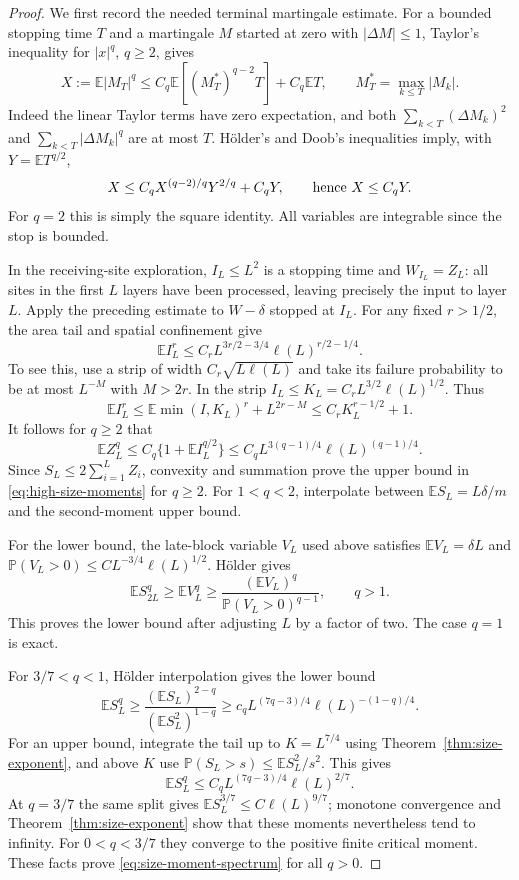 \documentclass[11pt]{article}
\numberwithin{equation}{section}
\theoremstyle{definition}
\newcommand{\E}{\mathbb E}
\newcommand{\Prob}{\mathbb P}
\begin{document}
\begin{proof}
We first record the needed terminal martingale estimate. For a bounded stopping time $T$ and a martingale $M$ started at zero with $|\Delta M|\le1$, Taylor's inequality for $|x|^q$, $q\ge2$, gives
\[
 X:=\E|M_T|^q
 \le C_q\E[(M_T^*)^{q-2}T]+C_q\E T,
 \qquad M_T^*=\max_{k\le T}|M_k|.
\]
Indeed the linear Taylor terms have zero expectation, and both $\sum_{k<T}(\Delta M_k)^2$ and $\sum_{k<T}|\Delta M_k|^q$ are at most $T$. H\"older's and Doob's inequalities imply, with $Y=\E T^{q/2}$,
\[
 X\le C_qX^{(q-2)/q}Y^{2/q}+C_qY,
 \qquad\hbox{hence }X\le C_qY.
\]
For $q=2$ this is simply the square identity. All variables are integrable since the stop is bounded.

In the receiving-site exploration, $I_L\le L^2$ is a stopping time and $W_{I_L}=Z_L$: all sites in the first $L$ layers have been processed, leaving precisely the input to layer $L$. Apply the preceding estimate to $W-\delta$ stopped at $I_L$. For any fixed $r>1/2$, the area tail and spatial confinement give
\begin{equation}\label{eq:truncated-area-higher-moments}
 \E I_L^r\le C_r L^{3r/2-3/4}\ell(L)^{r/2-1/4}.
\end{equation}
To see this, use a strip of width $C_r\sqrt{L\ell(L)}$ and take its failure probability to be at most $L^{-M}$ with $M>2r$. In the strip $I_L\le K_L=C_r L^{3/2}\ell(L)^{1/2}$. Thus
\[
 \E I_L^r\le\E\min(I,K_L)^r+L^{2r-M}
 \le C_rK_L^{r-1/2}+1.
\]
It follows for $q\ge2$ that
\[
 \E Z_L^q\le C_q\{1+\E I_L^{q/2}\}
 \le C_q L^{3(q-1)/4}\ell(L)^{(q-1)/4}.
\]
Since $S_L\le2\sum_{i=1}^LZ_i$, convexity and summation prove the upper bound in \eqref{eq:high-size-moments} for $q\ge2$. For $1<q<2$, interpolate between $\E S_L=L\delta/m$ and the second-moment upper bound.

For the lower bound, the late-block variable $V_L$ used above satisfies $\E V_L=\delta L$ and $\Prob(V_L>0)\le C L^{-3/4}\ell(L)^{1/2}$. H\"older gives
\[
 \E S_{2L}^q\ge\E V_L^q
 \ge\frac{(\E V_L)^q}{\Prob(V_L>0)^{q-1}},\qquad q>1.
\]
This proves the lower bound after adjusting $L$ by a factor of two. The case $q=1$ is exact.

For $3/7<q<1$, H\"older interpolation gives the lower bound
\[
 \E S_L^q\ge\frac{(\E S_L)^{2-q}}{(\E S_L^2)^{1-q}}
 \ge c_q L^{(7q-3)/4}\ell(L)^{-(1-q)/4}.
\]
For an upper bound, integrate the tail up to $K=L^{7/4}$ using Theorem~\ref{thm:size-exponent}, and above $K$ use $\Prob(S_L>s)\le\E S_L^2/s^2$. This gives
\[
 \E S_L^q\le C_q L^{(7q-3)/4}\ell(L)^{2/7}.
\]
At $q=3/7$ the same split gives $\E S_L^{3/7}\le C\ell(L)^{9/7}$; monotone convergence and Theorem~\ref{thm:size-exponent} show that these moments nevertheless tend to infinity. For $0<q<3/7$ they converge to the positive finite critical moment. These facts prove \eqref{eq:size-moment-spectrum} for all $q>0$.
\end{proof}
\end{document}
